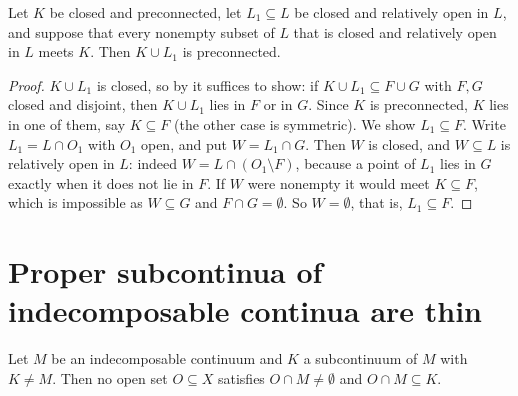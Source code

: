 \begin{lemma}\label{lem:union-clopen}
Let $K$ be closed and preconnected, let $L_1\subseteq L$ be closed and relatively open in $L$, and
suppose that every nonempty subset of $L$ that is closed and relatively open in $L$ meets $K$.
Then $K\cup L_1$ is preconnected.
\end{lemma}

\begin{proof}
$K\cup L_1$ is closed, so by  it suffices to show: if $K\cup L_1\subseteq F\cup G$ with
$F,G$ closed and disjoint, then $K\cup L_1$ lies in $F$ or in $G$. Since $K$ is preconnected, $K$
lies in one of them, say $K\subseteq F$ (the other case is symmetric). We show $L_1\subseteq F$.
Write $L_1=L\cap O_1$ with $O_1$ open, and put $W=L_1\cap G$. Then $W$ is closed, and $W\subseteq L$
is relatively open in $L$: indeed $W=L\cap(O_1\setminus F)$, because a point of $L_1$ lies in $G$
exactly when it does not lie in $F$. If $W$ were nonempty it would meet $K\subseteq F$, which is
impossible as $W\subseteq G$ and $F\cap G=\emptyset$. So $W=\emptyset$, that is, $L_1\subseteq F$.
\end{proof}


\section{Proper subcontinua of indecomposable continua are thin}

\begin{theorem}\label{thm:thin}
Let $M$ be an indecomposable continuum and $K$ a subcontinuum of $M$ with $K\neq M$. Then no open
set $O\subseteq X$ satisfies $O\cap M\neq\emptyset$ and $O\cap M\subseteq K$.
\end{theorem}

